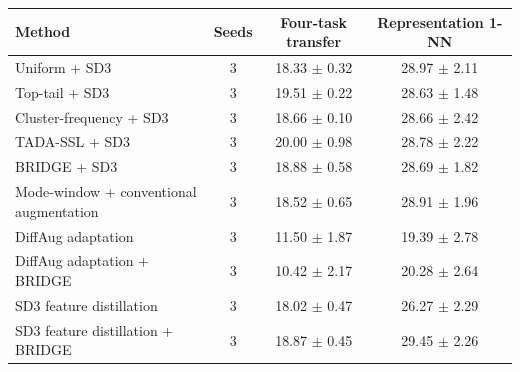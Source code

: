 \begin{tabular}{lccc}
\toprule
Method & Seeds & Four-task transfer & Representation 1-NN \\
\midrule
Uniform + SD3 & 3 & 18.33 $\pm$ 0.32 & 28.97 $\pm$ 2.11 \\
Top-tail + SD3 & 3 & 19.51 $\pm$ 0.22 & 28.63 $\pm$ 1.48 \\
Cluster-frequency + SD3 & 3 & 18.66 $\pm$ 0.10 & 28.66 $\pm$ 2.42 \\
TADA-SSL + SD3 & 3 & 20.00 $\pm$ 0.98 & 28.78 $\pm$ 2.22 \\
BRIDGE + SD3 & 3 & 18.88 $\pm$ 0.58 & 28.69 $\pm$ 1.82 \\
Mode-window + conventional augmentation & 3 & 18.52 $\pm$ 0.65 & 28.91 $\pm$ 1.96 \\
DiffAug adaptation & 3 & 11.50 $\pm$ 1.87 & 19.39 $\pm$ 2.78 \\
DiffAug adaptation + BRIDGE & 3 & 10.42 $\pm$ 2.17 & 20.28 $\pm$ 2.64 \\
SD3 feature distillation & 3 & 18.02 $\pm$ 0.47 & 26.27 $\pm$ 2.29 \\
SD3 feature distillation + BRIDGE & 3 & 18.87 $\pm$ 0.45 & 29.45 $\pm$ 2.26 \\
\bottomrule
\end{tabular}
